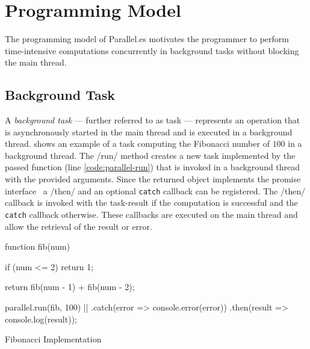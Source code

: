 \section{Programming Model}\label{sec:programming-model}
The programming model of Parallel.es motivates the programmer to perform time-intensive computations concurrently in background tasks without blocking the main thread. 

\subsection{Background Task}
A \textit{background task} --- further referred to as task --- represents an operation that is asynchronously started in the main thread and is executed in a background thread.  shows an example of a task computing the Fibonacci number of $100$ in a background thread. The \javascriptinline/run/ method creates a new task implemented by the passed function (line \ref{code:parallel-run}) that is invoked in a background thread with the provided arguments. Since the returned object implements the promise interface~\cite[Section 18.3.18]{ecmaScript2015} a \javascriptinline/then/ and an optional \texttt{catch} callback can be registered. The \javascriptinline/then/ callback is invoked with the task-result if the computation is successful and the \texttt{catch} callback otherwise. These callbacks are executed on the main thread and allow the retrieval of the result or error. 


\begin{listing}
	\begin{javascriptcode}
function fib(num) {
	if (num <= 2) {
    	return 1;
	}

	return fib(num - 1) + fib(num - 2);
}
        
parallel.run(fib, 100) |$\label{code:parallel-run}$|
	.catch(error => console.error(error))
	.then(result => console.log(result));	
	\end{javascriptcode}

	\caption{Fibonacci Implementation}
	\label{fig:fibonacci-implementation}
\end{listing}

